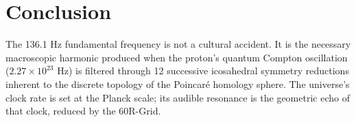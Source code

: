 \documentclass[12pt, a4paper]{article}
\theoremstyle{plain}
\theoremstyle{definition}
\begin{document}
\section{Conclusion}

The 136.1 Hz fundamental frequency is not a cultural accident. It is the necessary macroscopic harmonic produced when the proton's quantum Compton oscillation ($2.27 \times 10^{23}$ Hz) is filtered through 12 successive icosahedral symmetry reductions inherent to the discrete topology of the Poincar\'{e} homology sphere. The universe's clock rate is set at the Planck scale; its audible resonance is the geometric echo of that clock, reduced by the 60R-Grid.

\vspace{2em}
\noindent\hrulefill
\vspace{1em}







\vspace{3em}
\noindent\hrulefill
\vspace{1em}
\end{document}
